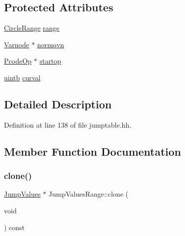 \subsection*{Protected Attributes}
\begin{DoxyCompactItemize}
\item 
\mbox{\hyperlink{class_circle_range}{Circle\+Range}} \mbox{\hyperlink{class_jump_values_range_a28e88d63fc5449372482bf0fc81f7f8d}{range}}
\item 
\mbox{\hyperlink{class_varnode}{Varnode}} $\ast$ \mbox{\hyperlink{class_jump_values_range_aa3d96b6af86c45bd140407a40e98026b}{normqvn}}
\item 
\mbox{\hyperlink{class_pcode_op}{Pcode\+Op}} $\ast$ \mbox{\hyperlink{class_jump_values_range_ac4da92c4190bf9f22662c9526075bd9c}{startop}}
\item 
\mbox{\hyperlink{types_8h_a2db313c5d32a12b01d26ac9b3bca178f}{uintb}} \mbox{\hyperlink{class_jump_values_range_a15d3ab3bdb44c4d833a70245dad8eb60}{curval}}
\end{DoxyCompactItemize}


\subsection{Detailed Description}


Definition at line 138 of file jumptable.\+hh.



\subsection{Member Function Documentation}
\mbox{\label{class_jump_values_range_a1e22013b45547017b47758fd8901b0ef}} 
\subsubsection{\texorpdfstring{clone()}{clone()}}
{\footnotesize\ttfamily \mbox{\hyperlink{class_jump_values}{Jump\+Values}} $\ast$ Jump\+Values\+Range\+::clone (\begin{DoxyParamCaption}\item[{void}]{ }\end{DoxyParamCaption}) const\hspace{0.3cm}{\ttfamily [virtual]}}



